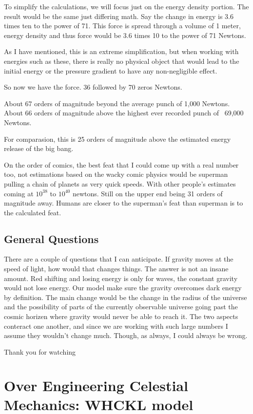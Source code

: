 To simplify the calculations, we will focus just on the energy density portion. The result would be the same just differing math. Say the change in energy is 3.6 times ten to the power of 71. This force is spread through a volume of 1 meter, energy density and thus force would be 3.6 times 10 to the power of 71 Newtons.

As I have mentioned, this is an extreme simplification, but when working with energies such as these, there is really no physical object that would lead to the initial energy or the pressure gradient to have any non-negligible effect.

So now we have the force. 36 followed by 70 zeros Newtons.

About 67 orders of magnitude beyond the average punch of 1,000 Newtons. About 66 orders of magnitude above the highest ever recorded punch of ~69,000 Newtons.

For comparasion, this is 25 orders of magnitude above the estimated energy release of the big bang.

On the order of comics, the best feat that I could come up with a real number too, not estimations based on the wacky comic physics would be superman pulling a chain of planets as very quick speeds. With other people's estimates coming at $10^{38}$ to $10^{40}$ newtons. Still on the upper end being 31 orders of magnitude away. Humans are closer to the superman's feat than superman is to the calculated feat.


\subsection{General Questions}

There are a couple of questions that I can anticipate. If gravity moves at the speed of light, how would that changes things. The answer is not an insane amount. Red shifting and losing energy is only for waves, the constant gravity would not lose energy. Our model make sure the gravity overcomes dark energy by definition. The main change would be the change in the radius of the universe and the possibility of parts of the currently observable universe going past the cosmic horizen where gravity would never be able to reach it. The two aspects conteract one another, and since we are working with such large numbers I assume they wouldn't change much. Though, as always, I could always be wrong.


Thank you for watching


\section{Over Engineering Celestial Mechanics: WHCKL model}

